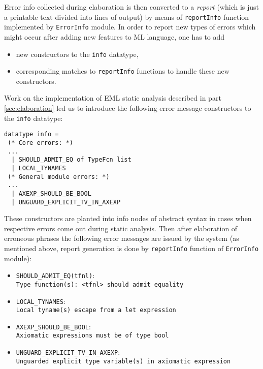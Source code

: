 Error info collected during elaboration is then converted to a {\em report}
(which is just a printable text divided into lines of output) by means
of {\tt reportInfo} function implemented by {\tt ErrorInfo} module.
In order to report new types of errors which might occur after adding 
new features to ML language, one has to add
\begin{itemize}
  \item new constructors to the {\tt info} datatype,
  \item corresponding matches to {\tt reportInfo} functions to handle
these new constructors.
\end{itemize}
Work on the implementation of EML static analysis described in part
\ref{sec:elaboration} led us to 
introduce the following error message constructors to the 
{\tt info} datatype:
{\small
\begin{verbatim}
datatype info =
 (* Core errors: *)
 ...
  | SHOULD_ADMIT_EQ of TypeFcn list
  | LOCAL_TYNAMES
 (* General module errors: *)
 ...
  | AXEXP_SHOULD_BE_BOOL
  | UNGUARD_EXPLICIT_TV_IN_AXEXP
\end{verbatim}
}
These constructors are planted into info nodes of abstract syntax 
in cases when respective errors come out during static analysis.
Then after elaboration of erroneous phrases the following error 
messages are issued by the system (as mentioned above, report 
generation is done by {\tt reportInfo} function of {\tt ErrorInfo} 
module):
\begin{itemize}
  \item {\tt SHOULD\_ADMIT\_EQ(tfnl)}: \\
   {\small \tt Type function(s): <tfnl> should admit equality}
  \item {\tt LOCAL\_TYNAMES}: \\
   {\small \tt Local tyname(s) escape from a let expression}
  \item {\tt AXEXP\_SHOULD\_BE\_BOOL}: \\
   {\small \tt Axiomatic expressions must be of type bool}
  \item {\tt UNGUARD\_EXPLICIT\_TV\_IN\_AXEXP}: \\
   {\small \tt Unguarded explicit type variable(s) in axiomatic expression}
\end{itemize}
